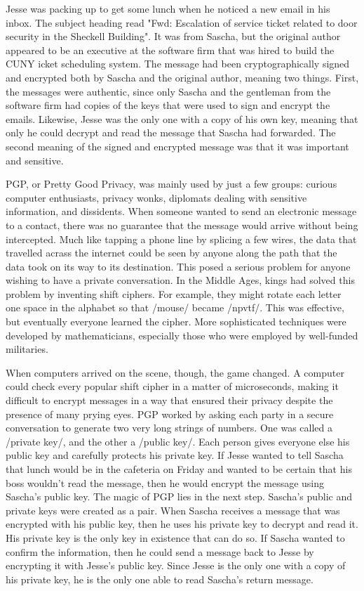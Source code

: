 Jesse was packing up to get some lunch when he noticed a new email in his inbox.  The subject heading read "Fwd: Escalation of service ticket related to door security in the Sheckell Building".  It was from Sascha, but the original author appeared to be an executive at the software firm that was hired to build the CUNY icket scheduling system.  The message had been cryptographically signed and encrypted both by Sascha and the original author, meaning two things.  First, the messages were authentic, since only Sascha and the gentleman from the software firm had copies of the keys that were used to sign and encrypt the emails.  Likewise, Jesse was the only one with a copy of his own key, meaning that only he could decrypt and read the message that Sascha had forwarded.  The second meaning of the signed and encrypted message was that it was important and sensitive.


PGP, or Pretty Good Privacy, was mainly used by just a few groups: curious computer enthusiasts, privacy wonks, diplomats dealing with sensitive information, and dissidents.  When someone wanted to send an electronic message to a contact, there was no guarantee that the message would arrive without being intercepted.  Much like tapping a phone line by splicing a few wires, the data that travelled acrass the internet could be seen by anyone along the path that the data took on its way to its destination.  This posed a serious problem for anyone wishing to have a private conversation.  In the Middle Ages, kings had solved this problem by inventing shift ciphers.  For example, they might rotate each letter one space in the alphabet so that /mouse/ became /npvtf/.  This was effective, but eventually everyone learned the cipher.  More sophisticated techniques were developed by mathematicians, especially those who were employed by well-funded militaries.

When computers arrived on the scene, though, the game changed.  A computer could check every popular shift cipher in a matter of microseconds, making it difficult to encrypt messages in a way that ensured their privacy despite the presence of many prying eyes.  PGP worked by asking each party in a secure conversation to generate two very long strings of numbers.  One was called a /private key/, and the other a /public key/.  Each person gives everyone else his public key and carefully protects his private key.  If Jesse wanted to tell Sascha that lunch would be in the cafeteria on Friday and wanted to be certain that his boss wouldn't read the message, then he would encrypt the message using Sascha's public key.  The magic of PGP lies in the next step.  Sascha's public and private keys were created as a pair.  When Sascha receives a message that was encrypted with his public key, then he uses his private key to decrypt and read it.  His private key is the only key in existence that can do so.  If Sascha wanted to confirm the information, then he could send a message back to Jesse by encrypting it with Jesse's public key.  Since Jesse is the only one with a copy of his private key, he is the only one able to read Sascha's return message.


